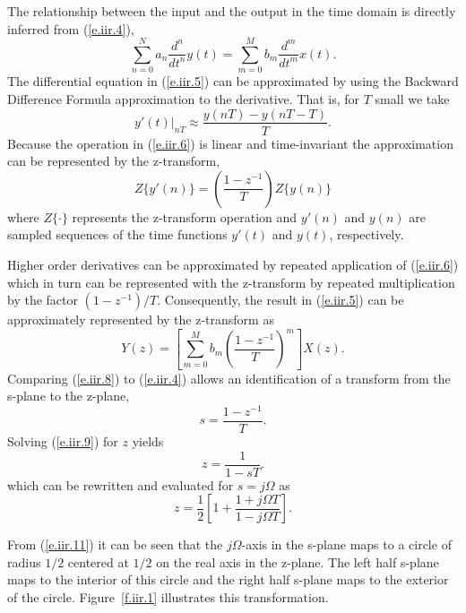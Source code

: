 	The relationship between the input and the output in the time domain 
is directly inferred from (\ref{e.iir.4}),
%
\begin{equation}
\sum_{n=0}^{N}a_n\frac{d^n}{dt^n}y(t)=\sum_{m=0}^{M}b_m\frac{d^m}{dt^m}x(t).
\label{e.iir.5}
\end{equation}
%
The differential equation in (\ref{e.iir.5}) can be approximated
by using the Backward Difference Formula approximation to the 
derivative.  That is, for $T$ small we take
%
\begin{equation}
y'(t)|_{nT}\approx \frac{y(nT)-y(nT-T)}{T}.
\label{e.iir.6}
\end{equation}
%
Because the operation in (\ref{e.iir.6}) is linear and time-invariant
the approximation can be represented by
the z-transform,
%
\begin{equation}
Z\{y'(n)\}=(\frac{1-z^{-1}}{T})Z\{y(n)\}
\label{e.iir.7}
\end{equation}
%
where $Z\{\cdot\}$ represents the z-transform operation and
$y'(n)$ and $y(n)$ are sampled sequences of the time functions
$y'(t)$ and $y(t)$, respectively.

	Higher order derivatives can be approximated by
repeated application of (\ref{e.iir.6}) which in turn can be
represented with the z-transform by repeated multiplication
by the factor $(1-z^{-1})/T$.  Consequently, the result
in (\ref{e.iir.5}) can be approximately represented by the z-transform
as
%
\begin{equation}
[\sum_{n=0}^{N}a_n(\frac{1-z^{-1}}{T})^n]Y(z)
=[\sum_{m=0}^{M}b_m(\frac{1-z^{-1}}{T})^m]X(z).
\label{e.iir.8}
\end{equation}
%
Comparing (\ref{e.iir.8}) to (\ref{e.iir.4}) allows an identification of a
transform from the s-plane to the z-plane,
%
\begin{equation}
s=\frac{1-z^{-1}}{T}.
\label{e.iir.9}
\end{equation}
%
Solving (\ref{e.iir.9}) for $z$ yields
%
\begin{equation}
z=\frac{1}{1-sT}.
\label{e.iir.10}
\end{equation}
%
which can be rewritten and evaluated for
$s=j\Omega$ as
%
\begin{equation}
z=\frac{1}{2}[1+\frac{1+j\Omega T}{1-j\Omega T}].
\label{e.iir.11}
\end{equation}
%

	From (\ref{e.iir.11}) it can be seen that the $j\Omega$-axis
in the s-plane maps to a circle of radius $1/2$ centered at
$1/2$ on the real axis in the z-plane.  The left half s-plane
maps to the interior of this circle and the right half s-plane
maps to the exterior of the circle.  Figure~\ref{f.iir.1} illustrates
this transformation.
%

%

